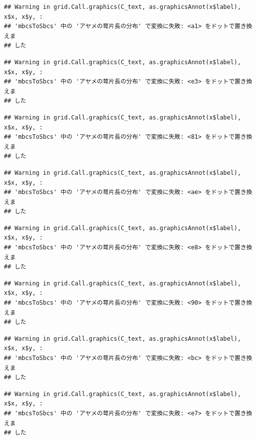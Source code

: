 \documentclass[
]{book}
\begin{document}
\begin{verbatim}
## Warning in grid.Call.graphics(C_text, as.graphicsAnnot(x$label), x$x, x$y, :
## 'mbcsToSbcs' 中の 'アヤメの萼片長の分布' で変換に失敗: <a1> をドットで置き換えま
## した
\end{verbatim}

\begin{verbatim}
## Warning in grid.Call.graphics(C_text, as.graphicsAnnot(x$label), x$x, x$y, :
## 'mbcsToSbcs' 中の 'アヤメの萼片長の分布' で変換に失敗: <e3> をドットで置き換えま
## した
\end{verbatim}

\begin{verbatim}
## Warning in grid.Call.graphics(C_text, as.graphicsAnnot(x$label), x$x, x$y, :
## 'mbcsToSbcs' 中の 'アヤメの萼片長の分布' で変換に失敗: <81> をドットで置き換えま
## した
\end{verbatim}

\begin{verbatim}
## Warning in grid.Call.graphics(C_text, as.graphicsAnnot(x$label), x$x, x$y, :
## 'mbcsToSbcs' 中の 'アヤメの萼片長の分布' で変換に失敗: <ae> をドットで置き換えま
## した
\end{verbatim}

\begin{verbatim}
## Warning in grid.Call.graphics(C_text, as.graphicsAnnot(x$label), x$x, x$y, :
## 'mbcsToSbcs' 中の 'アヤメの萼片長の分布' で変換に失敗: <e8> をドットで置き換えま
## した
\end{verbatim}

\begin{verbatim}
## Warning in grid.Call.graphics(C_text, as.graphicsAnnot(x$label), x$x, x$y, :
## 'mbcsToSbcs' 中の 'アヤメの萼片長の分布' で変換に失敗: <90> をドットで置き換えま
## した
\end{verbatim}

\begin{verbatim}
## Warning in grid.Call.graphics(C_text, as.graphicsAnnot(x$label), x$x, x$y, :
## 'mbcsToSbcs' 中の 'アヤメの萼片長の分布' で変換に失敗: <bc> をドットで置き換えま
## した
\end{verbatim}

\begin{verbatim}
## Warning in grid.Call.graphics(C_text, as.graphicsAnnot(x$label), x$x, x$y, :
## 'mbcsToSbcs' 中の 'アヤメの萼片長の分布' で変換に失敗: <e7> をドットで置き換えま
## した
\end{verbatim}
\end{document}

